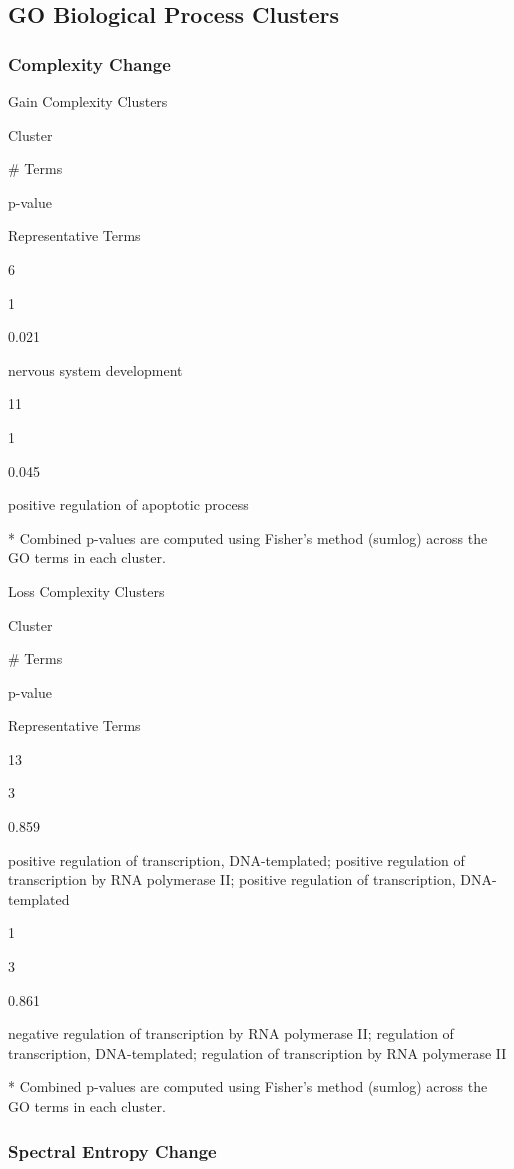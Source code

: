 \documentclass[
  letterpaper,
  DIV=11,
  numbers=noendperiod,
  openany,
  oneside]{scrreprt}
\begin{document}
\subsection{GO Biological Process Clusters}

\subsubsection{Complexity Change}

Gain Complexity Clusters

Cluster

\# Terms

p-value

Representative Terms

6

1

0.021

nervous system development

11

1

0.045

positive regulation of apoptotic process

* Combined p-values are computed using Fisher's method (sumlog) across
the GO terms in each cluster.

Loss Complexity Clusters

Cluster

\# Terms

p-value

Representative Terms

13

3

0.859

positive regulation of transcription, DNA-templated; positive regulation
of transcription by RNA polymerase II; positive regulation of
transcription, DNA-templated

1

3

0.861

negative regulation of transcription by RNA polymerase II; regulation of
transcription, DNA-templated; regulation of transcription by RNA
polymerase II

* Combined p-values are computed using Fisher's method (sumlog) across
the GO terms in each cluster.

\subsubsection{Spectral Entropy Change}
\end{document}
